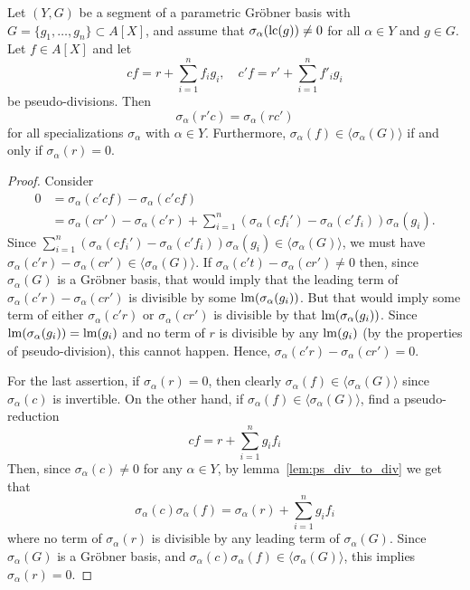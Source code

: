 \begin{lemma}\label{lem:ps_rem_unique}
  Let $(Y, G)$ be a segment of a parametric Gröbner basis with $G = \{g_{1}, \dots, g_{n}\} \subset A[X]$, and assume that $\sigma_{\alpha}(\operatorname{lc}(g)) \neq 0$ for all $\alpha \in Y$ and $g \in G$. Let $f \in A[X]$ and let
  \[cf = r + \sum_{i=1}^{n} f_{i} g_{i}, \quad c'f = r' + \sum_{i=1}^{n} f'_{i} g_{i}\]
  be pseudo-divisions. Then
  \[\sigma_{\alpha}(r'c) = \sigma_{\alpha}(rc')\]
  for all specializations $\sigma_{\alpha}$ with $\alpha \in Y$. Furthermore, $\sigma_{\alpha}(f) \in \langle \sigma_{\alpha}(G) \rangle$ if and only if $\sigma_{\alpha}(r) = 0$.
\end{lemma}
\begin{proof}
  Consider
  \begin{align*}
    0 &= \sigma_{\alpha}(c' c f) - \sigma_{\alpha}(c' c f) \\
      &= \sigma_{\alpha}(cr') - \sigma_{\alpha}(c'r) + \sum_{i=1}^{n}\left(\sigma_{\alpha}(c f_{i}') - \sigma_{\alpha}(c' f_{i})\right)\sigma_{\alpha}(g_{i}).
  \end{align*}
  Since $\sum_{i=1}^{n}(\sigma_{\alpha}(c f_{i}') - \sigma_{\alpha}(c' f_{i}))\sigma_{\alpha}(g_{i}) \in \langle \sigma_{\alpha}(G) \rangle$, we must have $\sigma_{\alpha}(c' r) - \sigma_{\alpha}(c r') \in \langle \sigma_{\alpha}(G) \rangle$. If $\sigma_{\alpha}(c't) - \sigma_{\alpha}(cr') \neq 0$ then, since $\sigma_{\alpha}(G)$ is a Gröbner basis, that would imply that the leading term of $\sigma_{\alpha}(c' r) - \sigma_{\alpha}(c r')$ is divisible by some $\operatorname{lm}(\sigma_{\alpha}(g_{i}))$. But that would imply some term of either $\sigma_{\alpha}(c' r)$ or $\sigma_{\alpha}(c r')$ is divisible by that $\operatorname{lm}(\sigma_{\alpha}(g_{i}))$. Since $\operatorname{lm}(\sigma_{\alpha}(g_{i})) = \operatorname{lm}(g_{i})$ and no term of $r$ is divisible by any $\operatorname{lm}(g_{i})$ (by the properties of pseudo-division), this cannot happen. Hence, $\sigma_{\alpha}(c' r) - \sigma_{\alpha}(c r') = 0$.

  For the last assertion, if $\sigma_{\alpha}(r) = 0$, then clearly $\sigma_{\alpha}(f) \in \langle \sigma_{\alpha}(G) \rangle$ since $\sigma_{\alpha}(c)$ is invertible. On the other hand, if $\sigma_{\alpha}(f) \in \langle \sigma_{\alpha}(G) \rangle$, find a pseudo-reduction
  \[c f = r + \sum_{i=1}^{n} g_{i} f_{i}\]
  Then, since $\sigma_{\alpha}(c) \neq 0$ for any $\alpha \in Y$, by lemma~\ref{lem:ps_div_to_div} we get that
  \[\sigma_{\alpha}(c)\sigma_{\alpha}(f) = \sigma_{\alpha}(r) + \sum_{i=1}^{n} g_{i} f_{i}\]
  where no term of $\sigma_{\alpha}(r)$ is divisible by any leading term of $\sigma_{\alpha}(G)$. Since $\sigma_{\alpha}(G)$ is a Gröbner basis, and $\sigma_{\alpha}(c) \sigma_{\alpha}(f) \in \langle \sigma_{\alpha}(G) \rangle$, this implies $\sigma_{\alpha}(r) = 0$.
\end{proof}

